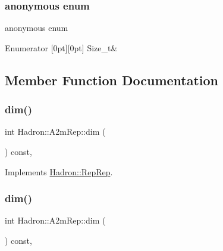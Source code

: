 \subsubsection{\texorpdfstring{anonymous enum}{anonymous enum}}
{\footnotesize\ttfamily anonymous enum}

\begin{DoxyEnumFields}{Enumerator}
[0pt][0pt]{}\mbox{\label{structHadron_1_1A2mRep_a2fdb2e614c6ddbc35bd8df74ab90f221a5e3da09ce3082c28664c38da1b8d6ac3}} 
Size\+\_\+t&\\
\hline

\end{DoxyEnumFields}


\subsection{Member Function Documentation}
\mbox{\label{structHadron_1_1A2mRep_afa793882b0e3f47c922a65b8a17750a3}} 
\subsubsection{\texorpdfstring{dim()}{dim()}\hspace{0.1cm}{\footnotesize\ttfamily [1/5]}}
{\footnotesize\ttfamily int Hadron\+::\+A2m\+Rep\+::dim (\begin{DoxyParamCaption}{ }\end{DoxyParamCaption}) const\hspace{0.3cm}{\ttfamily [inline]}, {\ttfamily [virtual]}}



Implements \mbox{\hyperlink{structHadron_1_1RepRep_a92c8802e5ed7afd7da43ccfd5b7cd92b}{Hadron\+::\+Rep\+Rep}}.

\mbox{\label{structHadron_1_1A2mRep_afa793882b0e3f47c922a65b8a17750a3}} 
\subsubsection{\texorpdfstring{dim()}{dim()}\hspace{0.1cm}{\footnotesize\ttfamily [2/5]}}
{\footnotesize\ttfamily int Hadron\+::\+A2m\+Rep\+::dim (\begin{DoxyParamCaption}{ }\end{DoxyParamCaption}) const\hspace{0.3cm}{\ttfamily [inline]}, {\ttfamily [virtual]}}



